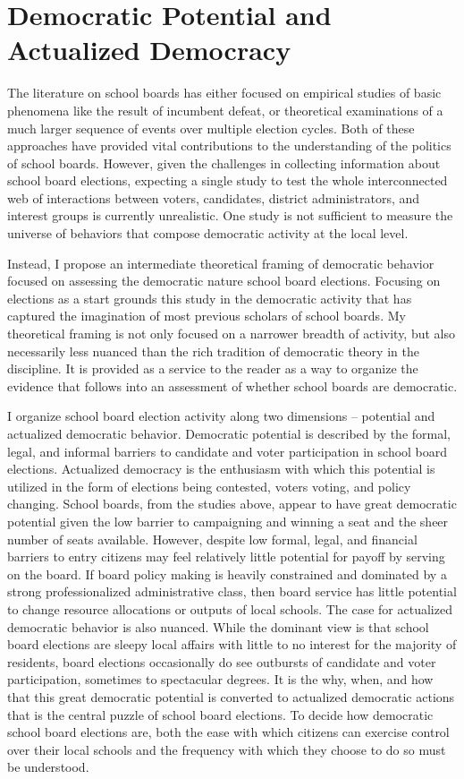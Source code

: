 \section{Democratic Potential and Actualized Democracy}

The literature on school boards has either focused on empirical studies of basic 
phenomena like the result of incumbent defeat, or theoretical examinations of a much 
larger sequence of events over multiple election cycles. Both of these approaches 
have provided vital contributions to the understanding of the politics of school 
boards. However, given the challenges in collecting information about school 
board elections, expecting a single study to test the whole interconnected web 
of interactions between voters, candidates, district administrators, and interest 
groups is currently unrealistic. One study is not sufficient to measure the 
universe of behaviors that compose democratic activity at the local level.

Instead, I propose an intermediate theoretical framing of democratic behavior focused 
on assessing the democratic nature school board elections. Focusing on elections as 
a start grounds this study in the democratic activity that has captured the imagination 
of most previous scholars of school boards. My theoretical framing is not only 
focused on a narrower breadth of activity, but also necessarily less nuanced than 
the rich tradition of democratic theory in the discipline. It is provided as a 
service to the reader as a way to organize the evidence that follows into an 
assessment of whether school boards are democratic. 

I organize school board election activity along two dimensions -- potential and 
actualized democratic behavior. Democratic potential is described by the formal, 
legal, and informal barriers to candidate and voter participation in school board 
elections. Actualized democracy is the enthusiasm with which this potential is 
utilized in the form of elections being contested, voters voting, and policy 
changing. School boards, from the studies above, appear to have great democratic 
potential given the low barrier to campaigning and winning a seat and the sheer 
number of seats available. However, despite low formal, legal, and financial 
barriers to entry citizens may feel relatively little potential for payoff by 
serving on the board. If board policy making is heavily constrained and dominated 
by a strong professionalized administrative class, then board service has little 
potential to change resource allocations or outputs of local schools. The case 
for actualized democratic behavior is also nuanced. While the dominant view is 
that school board elections are sleepy local affairs with little to no interest 
for the majority of residents, board elections occasionally do see outbursts of 
candidate and voter participation, sometimes to spectacular degrees. It is the 
why, when, and how that this great democratic potential is converted to actualized 
democratic actions that is the central puzzle of school board elections. To decide 
how democratic school board elections are, both the ease with which citizens can 
exercise control over their local schools and the frequency with which they choose 
to do so must be understood. 


